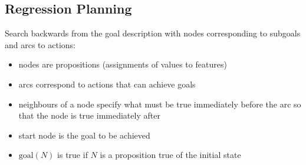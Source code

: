 \documentclass[11pt]{article}
\begin{document}
\begin{center}
\end{center}
\subsection{Regression Planning}
\label{sec:orgcb7a583}
Search backwards from the goal description with nodes corresponding to subgoals and arcs to actions:
\begin{itemize}
\item nodes are propositions (assignments of values to features)
\item arcs correspond to actions that can achieve goals
\item neighbours of a node specify what must be true immediately before the arc so that the node is true
immediately after
\item start node is the goal to be achieved
\item \(\text{goal}(N)\) is true if \(N\) is a proposition true of the initial state
\end{itemize}
\end{document}
